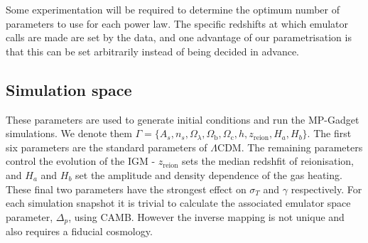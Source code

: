 \documentclass[]{article}
\begin{document}
\noindent Some experimentation will be required to determine the optimum number of 
parameters to use for each power law. The specific redshifts at which emulator calls are 
made are set by the data, and one advantage of our parametrisation is that this can be 
set arbitrarily instead of being decided in advance.

\subsection{Simulation space}
These parameters are used to generate initial conditions and run the MP-Gadget simulations.
We denote them $\Gamma=\{A_s, n_s, \Omega_\lambda, \Omega_\mathrm{b}, \Omega_\mathrm{c},h,
z_\mathrm{reion},H_a, H_b\}$. The first six parameters are the standard parameters of
$\Lambda$CDM. The remaining parameters control the evolution of the IGM -  $z_\mathrm{reion}$
sets the median redshfit of reionisation, and $H_a$ and $H_b$ set the amplitude and density
dependence of the gas heating. These final two parameters have the strongest
effect on $\sigma_T$ and $\gamma$ respectively. For each simulation snapshot it is
trivial to calculate the associated emulator space parameter, $\Delta_p$, using CAMB.
However the inverse mapping is not unique and also requires a fiducial cosmology.
\end{document}
